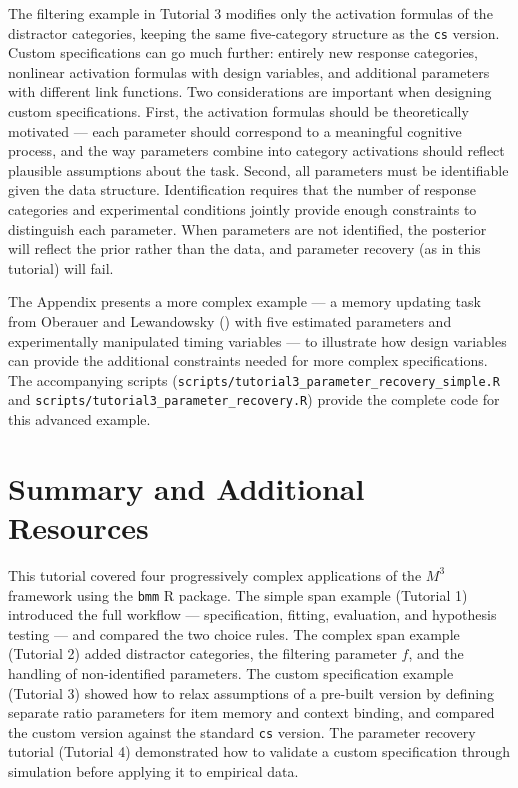 \documentclass[
  man,
  floatsintext,
  longtable,
  nolmodern,
  notxfonts,
  notimes,
  colorlinks=true,linkcolor=blue,citecolor=blue,urlcolor=blue]{apa7}
\begin{document}
The filtering example in Tutorial 3 modifies only the activation
formulas of the distractor categories, keeping the same five-category
structure as the \texttt{cs} version. Custom specifications can go much
further: entirely new response categories, nonlinear activation formulas
with design variables, and additional parameters with different link
functions. Two considerations are important when designing custom
specifications. First, the activation formulas should be theoretically
motivated --- each parameter should correspond to a meaningful cognitive
process, and the way parameters combine into category activations should
reflect plausible assumptions about the task. Second, all parameters
must be identifiable given the data structure. Identification requires
that the number of response categories and experimental conditions
jointly provide enough constraints to distinguish each parameter. When
parameters are not identified, the posterior will reflect the prior
rather than the data, and parameter recovery (as in this tutorial) will
fail.

The Appendix presents a more complex example --- a memory updating task
from Oberauer and Lewandowsky ()
with five estimated parameters and experimentally manipulated timing
variables --- to illustrate how design variables can provide the
additional constraints needed for more complex specifications. The
accompanying scripts
(\texttt{scripts/tutorial3\_parameter\_recovery\_simple.R} and
\texttt{scripts/tutorial3\_parameter\_recovery.R}) provide the complete
code for this advanced example.

\section{Summary and Additional
Resources}\label{summary-and-additional-resources}

This tutorial covered four progressively complex applications of the
\(M^3\) framework using the \texttt{bmm} R package. The simple span
example (Tutorial 1) introduced the full workflow --- specification,
fitting, evaluation, and hypothesis testing --- and compared the two
choice rules. The complex span example (Tutorial 2) added distractor
categories, the filtering parameter \(f\), and the handling of
non-identified parameters. The custom specification example (Tutorial 3)
showed how to relax assumptions of a pre-built version by defining
separate ratio parameters for item memory and context binding, and
compared the custom version against the standard \texttt{cs} version.
The parameter recovery tutorial (Tutorial 4) demonstrated how to
validate a custom specification through simulation before applying it to
empirical data.
\end{document}
